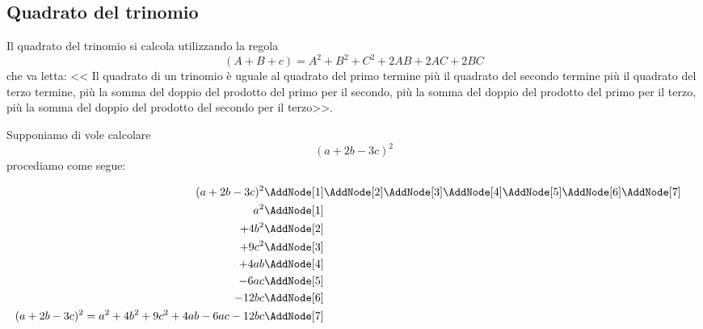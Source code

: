 \subsection{Quadrato del trinomio}
Il quadrato del trinomio si calcola utilizzando la regola\[(A+B+c)=A^2+B^2+C^2+2AB+2AC+2BC\] che va letta: << Il quadrato di un trinomio è uguale al quadrato del primo termine più il quadrato del secondo termine più il quadrato del terzo termine, più la somma del doppio del prodotto del primo per il secondo, più la somma del doppio del prodotto del primo per il terzo, più la somma del doppio del prodotto del secondo per il terzo>>. 
\begin{center}

\end{center}
\begin{esempio}
Supponiamo di vole calcolare \[(a+2b-3c)^2\]
procediamo come segue:
\begin{NodesList}
	\begin{align*}
(a+2b-3c)^2&\AddNode[1]\AddNode[2]\AddNode[3]\AddNode[4]\AddNode[5]\AddNode[6]\AddNode[7]\\
		a^2&\AddNode[1]&\\ 
		+4b^2&\AddNode[2]&\\
		+9c^2&\AddNode[3]\\
		+4ab&\AddNode[4]\\
		-6ac&\AddNode[5]\\
		-12bc&\AddNode[6]\\
		(a+2b-3c)^2=a^2+4b^2+9c^2+4ab-6ac-12bc&\AddNode[7]
	\end{align*}
\end{NodesList}
\end{esempio}
